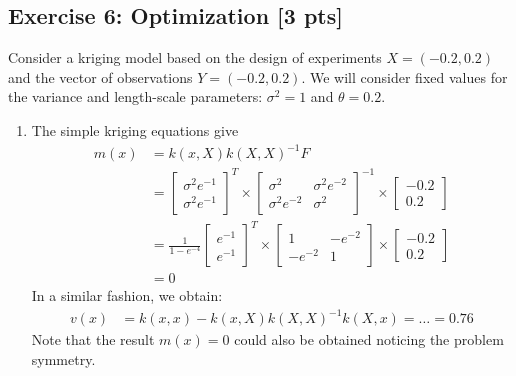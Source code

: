 \documentclass[a4paper,10pt]{article}
\begin{document}
\subsection*{Exercise 6: Optimization \hfill [3 pts]}

Consider a kriging model based on the design of experiments $X=(-0.2,0.2)$ and the vector of observations $Y=(-0.2,0.2)$. We will consider fixed values for the variance and length-scale parameters: $\sigma^2=1$ and $\theta=0.2$.
\begin{enumerate}[label=Q\arabic*.]
\item The simple kriging equations give 
\begin{align*}
	m(x) &= k(x,X)k(X,X)^{-1}F\\
	& = 
	 \left[ \begin{array}{ccc} \sigma^2 e^{-1} \\ \sigma^2e^{-1} \end{array}\right]^T 
	 \times \left[ \begin{array}{ccc}  \sigma^2 & \sigma^2e^{-2} \\ \sigma^2e^{-2} & \sigma^2   \end{array} \right] ^{-1} 
	 \times \left[ \begin{array}{ccc} -0.2 \\ 0.2 \end{array} \right]\\
	& = \frac{1}{1 - e^{-4}} \left[ \begin{array}{ccc} e^{-1} \\ e^{-1} \end{array}\right]^T
	 \times \left[ \begin{array}{ccc}  1 & -e^{-2} \\ -e^{-2} & 1   \end{array} \right]
	 \times \left[ \begin{array}{ccc} -0.2 \\ 0.2 \end{array} \right]\\
	& = 0 
\end{align*}
In a similar fashion, we obtain:
\begin{align*}
	v(x) &= k(x,x) - k(x,X)k(X,X)^{-1}k(X,x) = \dots = 0.76 
\end{align*}
Note that the result $m(x)=0$ could also be obtained noticing the problem symmetry. 


\end{enumerate}
\end{document}
